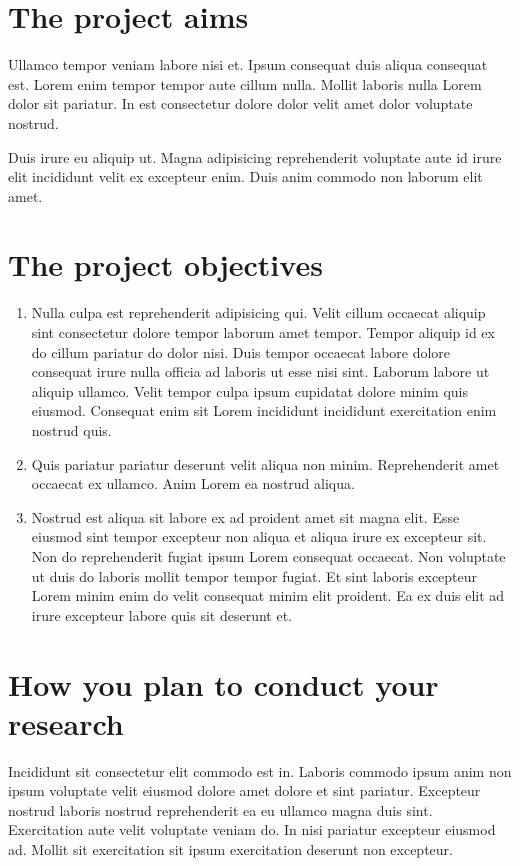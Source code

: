 \documentclass[a4paper, notitlepage, 11pt]{article}
\begin{document}
\section{The project aims}
Ullamco tempor veniam labore nisi et. Ipsum consequat duis aliqua consequat est. Lorem enim tempor tempor aute cillum nulla. Mollit laboris nulla Lorem dolor sit pariatur. In est consectetur dolore dolor velit amet dolor voluptate nostrud.

Duis irure eu aliquip ut. Magna adipisicing reprehenderit voluptate aute id irure elit incididunt velit ex excepteur enim. Duis anim commodo non laborum elit amet.

\section{The project objectives}

\begin{enumerate}
    \item Nulla culpa est reprehenderit adipisicing qui. Velit cillum occaecat aliquip sint consectetur dolore tempor laborum amet tempor. Tempor aliquip id ex do cillum pariatur do dolor nisi. Duis tempor occaecat labore dolore consequat irure nulla officia ad laboris ut esse nisi sint. Laborum labore ut aliquip ullamco. Velit tempor culpa ipsum cupidatat dolore minim quis eiusmod. Consequat enim sit Lorem incididunt incididunt exercitation enim nostrud quis.

    \item Quis pariatur pariatur deserunt velit aliqua non minim. Reprehenderit amet occaecat ex ullamco. Anim Lorem ea nostrud aliqua.

    \item Nostrud est aliqua sit labore ex ad proident amet sit magna elit. Esse eiusmod sint tempor excepteur non aliqua et aliqua irure ex excepteur sit. Non do reprehenderit fugiat ipsum Lorem consequat occaecat. Non voluptate ut duis do laboris mollit tempor tempor fugiat. Et sint laboris excepteur Lorem minim enim do velit consequat minim elit proident. Ea ex duis elit ad irure excepteur labore quis sit deserunt et.
\end{enumerate}

\section{How you plan to conduct your research}
Incididunt sit consectetur elit commodo est in. Laboris commodo ipsum anim non ipsum voluptate velit eiusmod dolore amet dolore et sint pariatur. Excepteur nostrud laboris nostrud reprehenderit ea eu ullamco magna duis sint. Exercitation aute velit voluptate veniam do. In nisi pariatur excepteur eiusmod ad. Mollit sit exercitation sit ipsum exercitation deserunt non excepteur.



\end{document}

